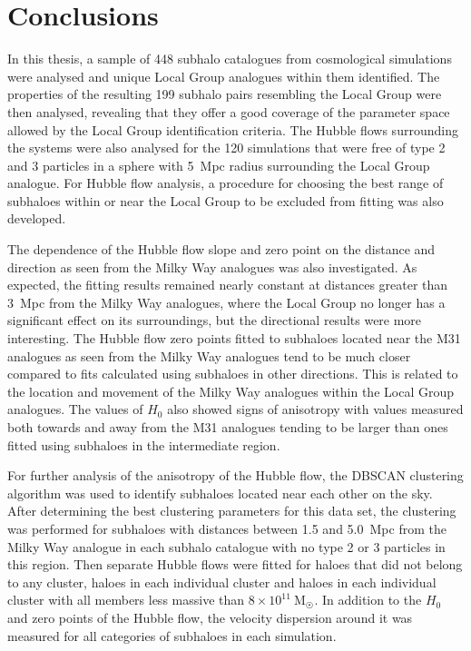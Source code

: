 \documentclass[english, twoside]{HYgradu}
\begin{document}
\chapter{Conclusions}
In this thesis, a sample of 448 subhalo catalogues from cosmological simulations were analysed and unique Local Group analogues within them identified. The properties of the resulting 199 subhalo pairs resembling the Local Group were then analysed, revealing that they offer a good coverage of the parameter space allowed by the Local Group identification criteria. The Hubble flows surrounding the systems were also analysed for the 120 simulations that were free of type 2 and 3 particles in a sphere with 5~Mpc radius surrounding the Local Group analogue. For Hubble flow analysis, a procedure for choosing the best range of subhaloes within or near the Local Group to be excluded from fitting was also developed.

The dependence of the Hubble flow slope and zero point on the distance and direction as seen from the Milky Way analogues was also investigated. As expected, the fitting results remained nearly constant at distances greater than 3~Mpc from the Milky Way analogues, where the Local Group no longer has a significant effect on its surroundings, but the directional results were more interesting. The Hubble flow zero points fitted to subhaloes located near the M31 analogues as seen from the Milky Way analogues tend to be much closer compared to fits calculated using subhaloes in other directions. This is related to the location and movement of the Milky Way analogues within the Local Group analogues. The values of $H_0$ also showed signs of anisotropy with values measured both towards and away from the M31 analogues tending to be larger than ones fitted using subhaloes in the intermediate region.

For further analysis of the anisotropy of the Hubble flow, the DBSCAN clustering algorithm was used to identify subhaloes located near each other on the sky. After determining the best clustering parameters for this data set, the clustering was performed for subhaloes with distances between 1.5 and 5.0~Mpc from the Milky Way analogue in each subhalo catalogue with no type 2 or 3 particles in this region. Then separate Hubble flows were fitted for haloes that did not belong to any cluster, haloes in each individual cluster and haloes in each individual cluster with all members less massive than $8 \times 10^{11}\ \mathrm{M}_{\astrosun}$. In addition to the $H_0$ and zero points of the Hubble flow, the velocity dispersion around it was measured for all categories of subhaloes in each simulation.
\end{document}
